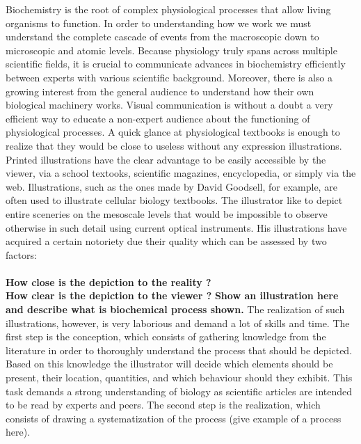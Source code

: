 Biochemistry is the root of complex physiological processes that allow living organisms to function.
In order to understanding how we work we must understand the complete cascade of events from the macroscopic down to microscopic and atomic levels.
Because physiology truly spans across multiple scientific fields, it is crucial to communicate advances in biochemistry efficiently between experts with various scientific background.
Moreover, there is also a growing interest from the general audience to understand how their own biological machinery works.
Visual communication is without a doubt a very efficient way to educate a non-expert audience about the functioning of physiological processes.
A quick glance at physiological textbooks is enough to realize that they would be close to useless without any expression illustrations.
Printed illustrations have the clear advantage to be easily accessible by the viewer, via a school textooks, scientific magazines, encyclopedia, or simply via the web. 
Illustrations, such as the ones made by David Goodsell, for example, are often used to illustrate cellular biology textbooks.
The illustrator like to depict entire sceneries on the mesoscale levels that would be impossible to observe otherwise in such detail  using current optical instruments.
His illustrations have acquired a certain notoriety due their quality which can be assessed by two factors:
\\
\\ \textbf{How close is the depiction to the reality ?}
\\ \textbf{How clear is the depiction to the viewer ?}
\textbf{Show an illustration here and describe what is biochemical process shown.}
The realization of such illustrations, however, is very laborious and demand a lot of skills and time.
The first step is the conception, which consists of gathering knowledge from the literature in order to thoroughly understand the process that should be depicted.
Based on this knowledge the illustrator will decide which elements should be present, their location, quantities, and which behaviour should they exhibit.
This task demands a strong understanding of biology as scientific articles are intended to be read by experts and peers.
The second step is the realization, which consists of drawing a systematization of the process (give example of a process here).
